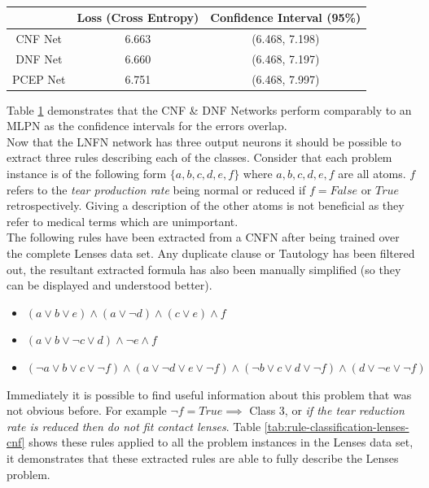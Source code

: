 \begin{table}[H]
	\begin{center}
		\begin{tabular}{| c | c | c |}
			\hline
			& Loss (Cross Entropy) & Confidence Interval (95\%) \\
			\hline
			CNF Net & 6.663 & (6.468, 7.198) \\
			\hline
			DNF Net & 6.660 & (6.468, 7.197) \\
			\hline
			PCEP Net & 6.751 & (6.468, 7.997) \\
			\hline
		\end{tabular}
	\end{center}
	\caption{}
	\label{tab:lenses-peformance-comp}
\end{table}

Table \ref{tab:lenses-peformance-comp} demonstrates that the CNF \& DNF Networks perform comparably to an MLPN as the confidence intervals for the errors overlap.\\ 

Now that the LNFN network has three output neurons it should be possible to extract three rules describing each of the classes. Consider that each problem instance is of the following form $\{a, b, c, d, e, f\}$ where $a,b,c,d,e,f$ are all atoms. $f$ refers to the \textit{tear production rate} being normal or reduced if $f = False$ or $True$ retrospectively. Giving a description of the other atoms is not beneficial as they refer to medical terms which are unimportant.\\

The following rules have been extracted from a CNFN after being trained over the complete Lenses data set. Any duplicate clause or Tautology has been filtered out, the resultant extracted formula has also been manually simplified (so they can be displayed and understood better).

\begin{itemize}
	\item {} $(a \lor b \lor e) \land (a \lor \lnot d) \land (c \lor e) \land f$
	\item {} $(a \lor b \lor \lnot c \lor d) \land \lnot e \land f$
	\item {} $(\lnot a \lor b \lor c \lor \lnot f) \land (a \lor \lnot d \lor e \lor \lnot f) \land (\lnot b \lor c \lor d \lor \lnot f) \land (d \lor \lnot e \lor \lnot f)$
\end{itemize}

Immediately it is possible to find useful information about this problem that was not obvious before. For example $\lnot f = True \implies $ Class 3, or \textit{if the tear reduction rate is reduced then do not fit contact lenses}. Table \ref{tab:rule-classification-lenses-cnf} shows these rules applied to all the problem instances in the Lenses data set, it demonstrates that these extracted rules are able to fully describe the Lenses problem.\\

